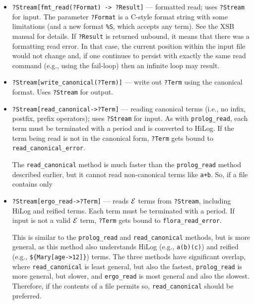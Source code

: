 \documentclass[11pt]{article}
\newcommand{\ERGO}{\mbox{\ensuremath{\cal{E}}\smaller{{\sc{RGO}}}}\xspace}
\newcommand{\FLSYSTEM}{\ERGO}
\begin{document}
\begin{itemize}
  \texttt{fmt\_write(?Format,?Term,\\?Options)}, but uses a previously open
  stream.
\item {\tt ?Stream[fmt\_read(?Format) -> ?Result]}  ---  formatted read;
  uses {\tt ?Stream} for input. The parameter
  \texttt{?Format} is a C-style format string
  with some limitations (and a new format \texttt{\%S}, which accepts any
  term). See the XSB manual for details. If \texttt{?Result} is returned
  unbound, it means that there was a formatting read error. In that case,
  the current position within the input file would not change and, if one
  continues to persist with exactly the same read command (e.g., using the
  fail-loop) then an infinite loop may result.
\item {\tt ?Stream[write\_canonical(?Term)]} --- write out \texttt{?Term}
  using the canonical format. 
  Uses {\tt ?Stream} for output.
\item {\tt ?Stream[read\_canonical->?Term]} --- reading canonical terms
  (i.e., no infix, postfix, prefix operators); uses {\tt ?Stream} for
  input. As with \texttt{prolog\_read}, each term must be terminated with a
  period and 
  is converted to HiLog.
  If the term being read
  is not in the canonical form, \texttt{?Term} gets bound to
  \texttt{read\_canonical\_error}.

  The \texttt{read\_canonical} method is much faster than the
  \texttt{prolog\_read} method described earlier, but it cannot read
  non-canonical terms like \texttt{a+b}. So, if a file contains only
\item
    \texttt{?Stream[ergo\_read->?Term]} 
  --- reads \FLSYSTEM terms from \texttt{?Stream}, including HiLog and
  reified terms. Each term must be terminated with a period. If input is
  not a valid \FLSYSTEM term, \texttt{?Term} gets bound to
  \texttt{flora\_read\_error}.  

  This is similar to the \texttt{prolog\_read} and \texttt{read\_canonical}   
  methods, but is more general, as this method also understands HiLog
  (e.g., \texttt{a(b)(c)}) and reified (e.g., \texttt{\$\{Mary[age->12]\}})
  terms.  The three methods have significant overlap, where
  \texttt{read\_canonical} is least general, but also the fastest,
  \texttt{prolog\_read} is more general, but slower, and
  \texttt{ergo\_read}
  is most general and also the slowest. Therefore, if the contents of a
  file permits so, \texttt{read\_canonical} should be preferred.


\end{itemize}
\end{document}

